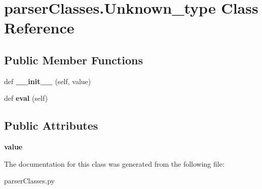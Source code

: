 \hypertarget{classparser_classes_1_1_unknown__type}{}\section{parser\+Classes.\+Unknown\+\_\+type Class Reference}
\label{classparser_classes_1_1_unknown__type}
\subsection*{Public Member Functions}
\begin{DoxyCompactItemize}
\item 
\mbox{\label{classparser_classes_1_1_unknown__type_a9562f0bab5ec63025079c370fc164f81}} 
def {\bfseries \+\_\+\+\_\+init\+\_\+\+\_\+} (self, value)
\item 
\mbox{\label{classparser_classes_1_1_unknown__type_a28e421b5d0e2a0f7fcf34dae75ac51b4}} 
def {\bfseries eval} (self)
\end{DoxyCompactItemize}
\subsection*{Public Attributes}
\begin{DoxyCompactItemize}
\item 
\mbox{\label{classparser_classes_1_1_unknown__type_a35589b9171b9277aa83a08ca38c10938}} 
{\bfseries value}
\end{DoxyCompactItemize}


The documentation for this class was generated from the following file\+:\begin{DoxyCompactItemize}
\item 
parser\+Classes.\+py\end{DoxyCompactItemize}
